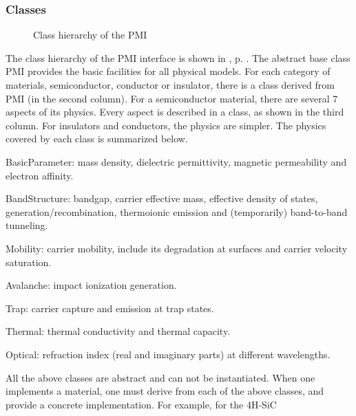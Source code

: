 \documentclass[oneside,12pt]{cgd_book}
\begin{document}
\subsubsection{Classes}
\begin{figure}[H]
\caption{\label{fig:Extend:PMI:Classes}Class hierarchy of the PMI}
\end{figure}
The class hierarchy of the PMI interface is shown in ,
p. \pageref{fig:Extend:PMI:Classes}. The
          abstract base class PMI provides the basic facilities for all physical models. For each category of materials,
          semiconductor, conductor or insulator, there is a class derived from PMI (in the second column). For a
          semiconductor material, there are several 7 aspects of its physics. Every aspect is described in a class, as
          shown in the third column. For insulators and conductors, the physics are simpler. The physics covered by each
          class is summarized below.
\par
\begin{compactitem}
\item BasicParameter: mass density, dielectric permittivity, magnetic permeability and electron
              affinity.
\par
\item BandStructure: bandgap, carrier effective mass, effective density of states,
              generation/recombination, thermoionic emission and (temporarily) band-to-band tunneling.
\par
\item Mobility: carrier mobility, include its degradation at surfaces and carrier velocity
              saturation.
\par
\item Avalanche: impact ionization generation.
\par
\item Trap: carrier capture and emission at trap states.
\par
\item Thermal: thermal conductivity and thermal capacity.
\par
\item Optical: refraction index (real and imaginary parts) at different wavelengths.
\par
\end{compactitem}
All the above classes are abstract and can not be instantiated. When one implements a material, one must
          derive from each of the above classes, and provide a concrete implementation. For example, for the 4H-SiC
\end{document}
